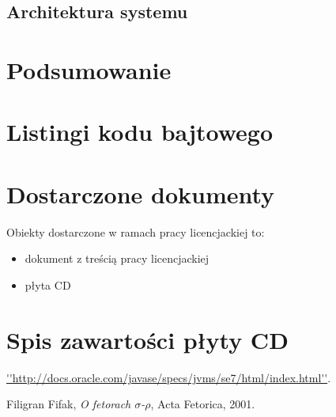 \documentclass{pracamgr}
\begin{document}
\section{Architektura systemu}




\chapter{Podsumowanie}\label{r:podsumowanie}


\appendix

\chapter{Listingi kodu bajtowego}


\chapter{Dostarczone dokumenty}

Obiekty dostarczone w ramach pracy licencjackiej to:
\begin{itemize}
\item dokument z treścią pracy licencjackiej
\item płyta CD
\end{itemize}

\chapter{Spis zawartości płyty CD}




\begin{thebibliography}{99}

 \url{''http://docs.oracle.com/javase/specs/jvms/se7/html/index.html''}.

 Filigran Fifak, \textit{O fetorach
    $\sigma$-$\rho$}, Acta Fetorica, 2001.

\end{thebibliography}
\end{document}
